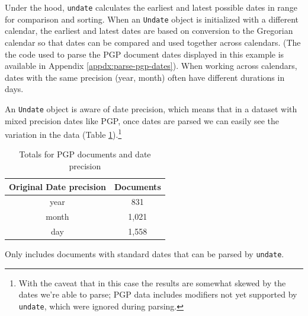\documentclass{anthology-ch}         %
\begin{document}
Under the hood, \texttt{undate} calculates the earliest and latest possible dates in range for comparison and sorting. When an \texttt{Undate} object is initialized with a different calendar, the earliest and latest dates are based on conversion to the Gregorian calendar so that dates can be compared and used together across calendars. (The the code used to parse the PGP document dates displayed in this example is available in Appendix \ref{appdx:parse-pgp-dates}). When working across calendars, dates with the same precision (year, month) often have different durations in days.

An \texttt{Undate} object is aware of date precision, which means that in a dataset with mixed precision dates like PGP, once dates are parsed we can easily see the variation in the data (Table \ref{tab:pgp-date-precisions}).\footnote{With the caveat that in this case the results are somewhat skewed by the dates we're able to parse; PGP data includes modifiers not yet supported by \texttt{undate}, which were ignored during parsing.}

\begin{table}[h]
  \centering 
  \begin{tabular}{cc}
    \toprule
    Original Date precision & Documents \\ 
    \midrule
    year & 831 \\
    month & 1,021 \\
    day & 1,558 \\
    \bottomrule
  \end{tabular}
  \caption{Totals for PGP documents and date precision}
    \medskip
    \small
    Only includes documents with standard dates that can be parsed by \texttt{undate}.
  \label{tab:pgp-date-precisions}
\end{table}
\end{document}
